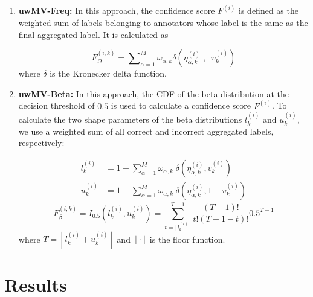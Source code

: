 \begin{enumerate}
    \item \textbf{uwMV-Freq:} In this approach, the confidence score $F^{(i)} $ is defined as the weighted sum of labels belonging to annotators whose label is the same as the final aggregated label. It is calculated as

    \begin{equation}
        F_{\Omega}^{(i,k)} = {\sum\nolimits_{\alpha=1}^{M}{\omega_{\alpha,k} \delta\left(\eta_{\alpha,k}^{(i)} \;,\;\; v_k^{(i)}\right)}}
        \label{eq:crowd.eq.13.confidence-score.freq}
    \end{equation}
    where $\delta $ is the Kronecker delta function.


    \item \textbf{uwMV-Beta:} In this approach, the CDF of the beta distribution at the decision threshold of $0.5 $ is used to calculate a confidence score $F^{(i)} $. To calculate the two shape parameters of the beta distributions $l_{k}^{(i)} $ and $u_{k}^{(i)} $, we use a weighted sum of all correct and incorrect aggregated labels, respectively:

    \begin{equation}
        \begin{aligned}
            l_k^{(i)} &= 1 + \sum_{\alpha=1}^{M} \omega_{\alpha,k} \; \delta\left(\eta_{\alpha,k}^{(i)}, v_{k}^{(i)}\right) \\
            u_k^{(i)} &= 1 + \sum_{\alpha=1}^{M} \omega_{\alpha,k} \; \delta\left(\eta_{\alpha,k}^{(i)}, 1 - v_{k}^{(i)}\right)
        \end{aligned}
        \label{eq:crowd.eq.14.beta_l_u}
    \end{equation}
    \begin{equation}
        F_{\beta}^{(i,k)}=I_{0.5}\left(l_k^{(i)},u_k^{(i)}\right)=\sum_{t=\lfloor l_k^{(i)}\rfloor}^{T-1}\frac{(T-1)!}{t!(T-1-t)!}0.5^{T-1}
        \label{eq:crowd.eq.15.confidence-score.beta}
    \end{equation}
    where $T=\left\lfloor l_k^{(i)} + u_k^{(i)}\right\rfloor $ and $\left\lfloor\cdot\right\rfloor $ is the floor function.

\end{enumerate}



\section{Results}

